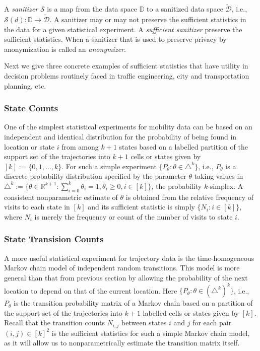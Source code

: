 \documentclass{llncs}
\begin{document}
A {\em sanitizer} $\mathcal{S}$ is a map from the data space $\mathbb{D}$ to a sanitized data space $\tilde{\mathcal{D}}$, i.e., $\mathcal{S}(d): \mathbb{D} \to \tilde{\mathcal{D}}$.
A sanitizer may or may not preserve the sufficient statistics in the data for a given statistical experiment.
A {\em sufficient sanitizer} preserve the sufficient statistics. 
When a sanitizer that is used to preserve privacy by anonymization is called an {\em anonymizer}.

Next we give three concrete examples of sufficient statistics that have utility in decision problems routinely faced in traffic engineering, city and transportation planning, etc.

\subsubsection{State Counts}
One of the simplest statistical experiments for mobility data can be based on an independent and identical distribution for the probability of being found in location or state $i$ from among $k+1$ states based on a labelled partition of the support set of the trajectories into $k+1$ cells or states given by $[k] := \{0,1,\ldots,k\}$.  
For such a simple experiment $\{P_{\theta}: \theta \in \triangle^k \}$, i.e., $P_{\theta}$ is a discrete probability distribution specified by the 
parameter $\theta$ taking values in 
$\triangle^k := \{ \theta \in \mathbb{R}^{k+1} : \sum_{i=0}^k \theta_i = 1, \theta_i \geq 0, i \in [k] \}$, 
the probability $k$-simplex. 
A consistent nonparametric estimate of $\theta$ is obtained from the relative frequency of visits to each state in $[k]$ and its sufficient statistic is simply $\{N_i: i \in [k]\}$, where $N_i$ is merely the frequency or count of the number of visits to state $i$.  

\subsubsection{State Transision Counts}
A more useful statistical experiment for trajectory data is the time-homogeneous Markov chain model of independent random transitions. This model is more general than that from previous section by allowing the probability of the next location to depend on that of the current location.   
Here $\{P_{\theta}: \theta \in (\triangle^k)^k\}$, i.e., $P_{\theta}$ is the transition probability matrix of a Markov chain based on a partition of the support set of the trajectories into $k+1$ labelled cells or states given by $[k]$.  
Recall that the transition counts $N_{i,j}$ between states $i$ and $j$ for each pair $(i,j) \in [k]^2$ is the sufficient statistics for such a simple Markov chain model, as it will allow us to nonparametrically estimate the transition matrix itself.  
\end{document}
